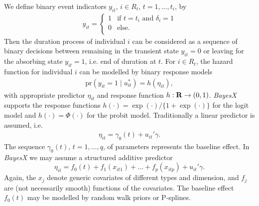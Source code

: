 \documentclass[11pt,a4paper,twoside]{bayesxarticle}
\def \re {{\bf R}}
\begin{document}
We define binary event indicators $y_{it}$, $i\in R_{t}$,
$t=1,\ldots,t_{i}$, by
\begin{eqnarray*}
  y_{it}=
   \left \{ \begin{array}{ll}
             1 & \mbox{if $t=t_{i}$ and $\delta_{i}=1$}\\
             0 & \mbox{else}.\\
          \end{array}   \right.
\end{eqnarray*}
Then the duration process of individual $i$ can be considered as a
sequence of binary decisions between remaining in the transient
state $y_{it}=0$ or leaving for the absorbing state $y_{it}=1$,
i.e. end of duration at $t$. For $i \in R_{t}$, the hazard
function for individual $i$ can be modelled by binary response
models
\begin{eqnarray} \label{gleichung1}
\mbox{pr}(y_{it}=1\mid u_{it}^*)=h(\eta_{it}),
\end{eqnarray}
with appropriate predictor $\eta_{it}$ and response function $h:
\re \rightarrow (0,1)$. {\em BayesX} supports the response
functions $h(\cdot)= \exp(\cdot)/ \{1+\exp(\cdot) \}$ for the
logit model and $h(\cdot )= \Phi(\cdot)$ for the probit model.
Traditionally a linear predictor is assumed, i.e.
\begin{eqnarray} \label{gleichung2}
\eta_{it}= \gamma_{0}(t)+u_{it}' \gamma.
\end{eqnarray}
The sequence ${\gamma_{0}(t),\, t=1,\ldots,q}$, of parameters
represents the baseline effect. In {\em BayesX} we may assume a
structured additive predictor
\begin{equation}
\label{gampred2} \eta_{it}=f_0(t) +
f_{1}(x_{it1})+\dots+f_{p}(x_{itp})+u_{it}'\gamma.
\end{equation}
Again, the $x_j$ denote generic covariates of different types and
dimension, and $f_j$ are (not necessarily smooth) functions of the
covariates. The baseline effect $f_0(t)$ may be modelled by random
walk priors or P-splines.
\end{document}
